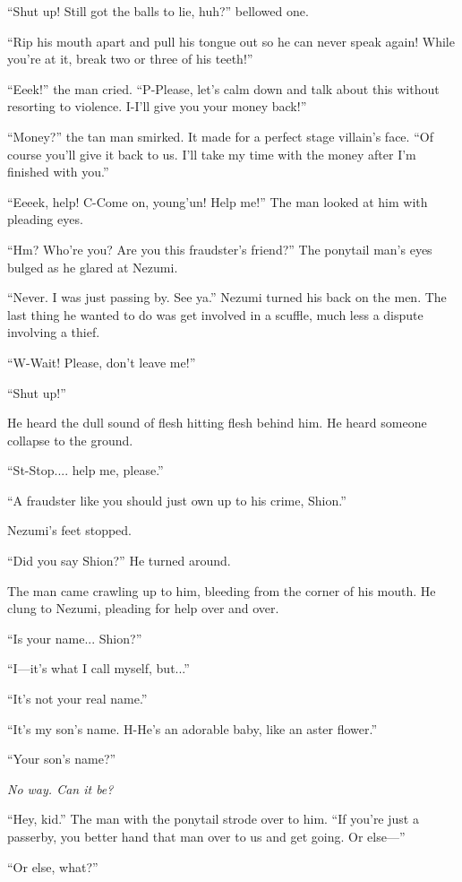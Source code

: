 ``Shut up! Still got the balls to lie, huh?'' bellowed one.

``Rip his mouth apart and pull his tongue out so he can never speak
again! While you're at it, break two or three of his teeth!''

``Eeek!'' the man cried. ``P-Please, let's calm down and talk about this
without resorting to violence. I-I'll give you your money back!''

``Money?'' the tan man smirked. It made for a perfect stage villain's
face. ``Of course you'll give it back to us. I'll take my time with the
money after I'm finished with you.''

``Eeeek, help! C-Come on, young'un! Help me!'' The man looked at him
with pleading eyes.

``Hm? Who're you? Are you this fraudster's friend?'' The ponytail man's
eyes bulged as he glared at Nezumi.

``Never. I was just passing by. See ya.'' Nezumi turned his back on the
men. The last thing he wanted to do was get involved in a scuffle, much
less a dispute involving a thief.

``W-Wait! Please, don't leave me!''

``Shut up!''

He heard the dull sound of flesh hitting flesh behind him. He heard
someone collapse to the ground.

``St-Stop.... help me, please.''

``A fraudster like you should just own up to his crime, Shion.''

Nezumi's feet stopped.

``Did you say Shion?'' He turned around.

The man came crawling up to him, bleeding from the corner of his mouth.
He clung to Nezumi, pleading for help over and over.

``Is your name... Shion?''

``I---it's what I call myself, but...''

``It's not your real name.''

``It's my son's name. H-He's an adorable baby, like an aster flower.''

``Your son's name?''

\emph{No way. Can it be?}

``Hey, kid.'' The man with the ponytail strode over to him. ``If you're
just a passerby, you better hand that man over to us and get going. Or
else---''

``Or else, what?''

